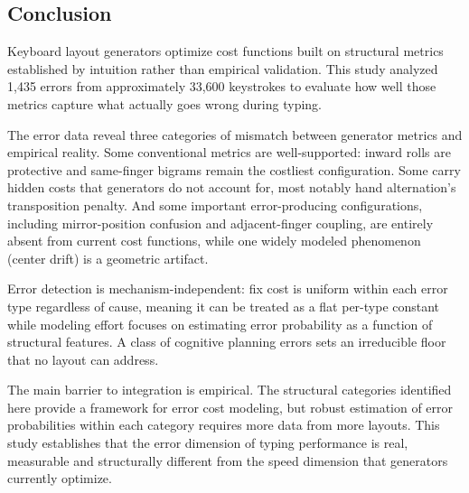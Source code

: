 \documentclass[12pt]{article}
\begin{document}
\subsection{Conclusion}

Keyboard layout generators optimize cost functions built on structural metrics established by intuition rather than empirical validation. This study analyzed 1,435 errors from approximately 33,600 keystrokes to evaluate how well those metrics capture what actually goes wrong during typing.

The error data reveal three categories of mismatch between generator metrics and empirical reality. Some conventional metrics are well-supported: inward rolls are protective and same-finger bigrams remain the costliest configuration. Some carry hidden costs that generators do not account for, most notably hand alternation's transposition penalty. And some important error-producing configurations, including mirror-position confusion and adjacent-finger coupling, are entirely absent from current cost functions, while one widely modeled phenomenon (center drift) is a geometric artifact.

Error detection is mechanism-independent: fix cost is uniform within each error type regardless of cause, meaning it can be treated as a flat per-type constant while modeling effort focuses on estimating error probability as a function of structural features. A class of cognitive planning errors sets an irreducible floor that no layout can address.

The main barrier to integration is empirical. The structural categories identified here provide a framework for error cost modeling, but robust estimation of error probabilities within each category requires more data from more layouts. This study establishes that the error dimension of typing performance is real, measurable and structurally different from the speed dimension that generators currently optimize.


\end{document}
